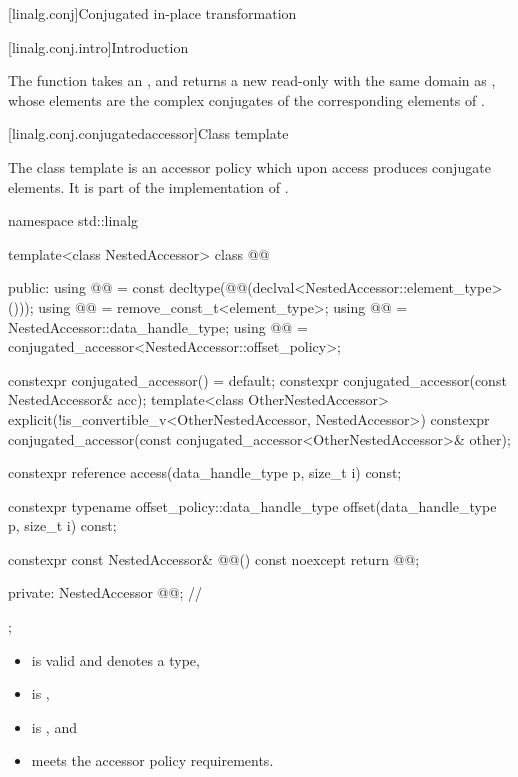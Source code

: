 [linalg.conj]{Conjugated in-place transformation}

[linalg.conj.intro]{Introduction}

\pnum
The  function takes an  ,
and returns a new read-only  
with the same domain as ,
whose elements are the complex conjugates
of the corresponding elements of .

[linalg.conj.conjugatedaccessor]{Class template }

\pnum
The class template 
is an  accessor policy
which upon access produces conjugate elements.
It is part of the implementation of
.

\begin{codeblock}
namespace std::linalg {
  template<class NestedAccessor>
  class @@ {
  public:
    using @@ =
      const decltype(@@(declval<NestedAccessor::element_type>()));
    using @@ = remove_const_t<element_type>;
    using @@ = NestedAccessor::data_handle_type;
    using @@ = conjugated_accessor<NestedAccessor::offset_policy>;

    constexpr conjugated_accessor() = default;
    constexpr conjugated_accessor(const NestedAccessor& acc);
    template<class OtherNestedAccessor>
      explicit(!is_convertible_v<OtherNestedAccessor, NestedAccessor>)
      constexpr conjugated_accessor(const conjugated_accessor<OtherNestedAccessor>& other);

    constexpr reference access(data_handle_type p, size_t i) const;

    constexpr typename offset_policy::data_handle_type
      offset(data_handle_type p, size_t i) const;

    constexpr const NestedAccessor& @@() const noexcept { return @@; }

  private:
    NestedAccessor @@{};                           // \expos
  };
}
\end{codeblock}

\pnum
\mandates
\begin{itemize}
\item
{} is valid and denotes a type,
\item
{} is ,
\item
{} is , and
\item
{} meets the accessor policy requirements.
\end{itemize}


